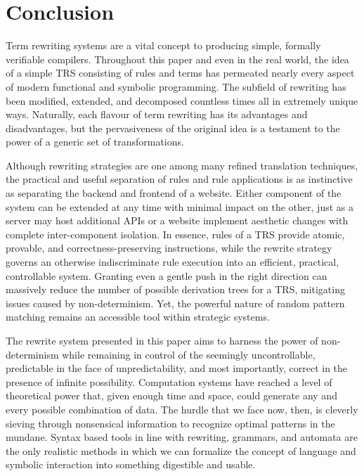 \documentclass{article}
\begin{document}
\section{Conclusion}

Term rewriting systems are a vital concept to producing simple, formally verifiable compilers.
Throughout this paper and even in the real world, the idea of a simple TRS consisting of rules and terms
has permeated nearly every aspect of modern functional and symbolic programming. The subfield of rewriting has been modified, extended, and decomposed
countless times all in extremely unique ways. Naturally, each flavour of term rewriting has its advantages and disadvantages, but the pervasiveness of the original idea
is a testament to the power of a generic set of transformations.

Although rewriting strategies are one among many refined translation techniques,
the practical and useful separation of rules and rule applications
is as instinctive as separating the backend and frontend of a website.
Either component of the system can be extended at any time with minimal impact on the other,
just as a server may host additional APIs or a website implement aesthetic changes with complete inter-component isolation.
In essence, rules of a TRS provide atomic, provable, and correctness-preserving instructions,
while the rewrite strategy governs an otherwise indiscriminate rule execution into an efficient, practical, controllable system.
Granting even a gentle push in the right direction can massively reduce the number of possible derivation trees for a TRS,
mitigating issues caused by non-determinism. Yet, the powerful nature of random pattern matching remains an accessible tool within strategic systems.

The rewrite system presented in this paper aims
to harness the power of non-determinism while remaining in control of the seemingly uncontrollable,
predictable in the face of unpredictability, and most importantly, correct in the presence of infinite possibility.
Computation systems have reached a level of theoretical power that, given enough time and space, could generate any and every possible
combination of data. The hurdle that we face now, then, is cleverly sieving through nonsensical information to recognize optimal patterns in the mundane.
Syntax based tools in line with rewriting, grammars, and automata are the only realistic methods in which we can formalize the concept of language and symbolic interaction
into something digestible and usable.

\pagebreak
\nocite{*} %
\printbibliography %
\end{document}
